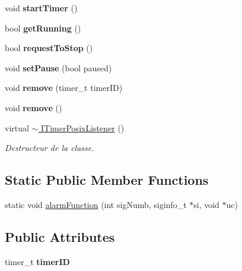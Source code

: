 \begin{DoxyCompactItemize}
void {\bfseries start\+Timer} ()
\item 
\mbox{\label{classITimerPosixListener_a947703910793e42988a0d082a7638c4a}} 
bool {\bfseries get\+Running} ()
\item 
\mbox{\label{classITimerPosixListener_a5d3f9eac245766f6c6f304417870a5ff}} 
bool {\bfseries request\+To\+Stop} ()
\item 
\mbox{\label{classITimerPosixListener_a4a0a8d4ee2f56f0244b0e4b110393fb0}} 
void {\bfseries set\+Pause} (bool paused)
\item 
\mbox{\label{classITimerPosixListener_a02ed7d5fc8fb16535016f4e9c8dbe6ab}} 
void {\bfseries remove} (timer\+\_\+t timer\+ID)
\item 
\mbox{\label{classITimerPosixListener_a543d5682e0e998afeb5f0237cae8c71d}} 
void {\bfseries remove} ()
\item 
\mbox{\label{classITimerPosixListener_ae7d5e0056bcd864a09b66a4d98c02590}} 
virtual \hyperlink{classITimerPosixListener_ae7d5e0056bcd864a09b66a4d98c02590}{$\sim$ I\+Timer\+Posix\+Listener} ()
\begin{DoxyCompactList}\small\item\em Destructeur de la classe. \end{DoxyCompactList}\end{DoxyCompactItemize}
\subsection*{Static Public Member Functions}
\begin{DoxyCompactItemize}
\item 
static void \hyperlink{classITimerPosixListener_af06fbcdd0f34a17d4341f896002860af}{alarm\+Function} (int sig\+Numb, siginfo\+\_\+t $\ast$si, void $\ast$uc)
\end{DoxyCompactItemize}
\subsection*{Public Attributes}
\begin{DoxyCompactItemize}
\item 
\mbox{\label{classITimerPosixListener_a642d6ebb49d6b62a63ded5f6fda178bc}} 
timer\+\_\+t {\bfseries timer\+ID}
\end{DoxyCompactItemize}

